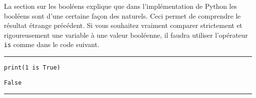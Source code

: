 La section sur les booléens explique que dans l'implémentation de Python les booléens sont d'une certaine façon des naturels. Ceci permet de comprendre le résultat étrange précédent. Si vous souhaitez vraiment comparer strictement et rigoureusement une variable à une valeur booléenne, il faudra utiliser l'opérateur \texttt{is} comme dans le code suivant.


\bigskip
{\hrule height .5mm}
\begin{verbatim}
print(1 is True)
\end{verbatim}
 \color{ForestGreen}
\vspace{-1.5em}
\begin{verbatim}
False
\end{verbatim} \color{Black}
{\hrule height .5mm}
\bigskip
